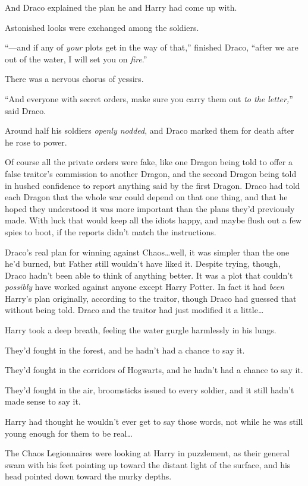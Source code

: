 And Draco explained the plan he and Harry had come up with.

Astonished looks were exchanged among the soldiers.

“—and if any of \emph{your} plots get in the way of that,” finished Draco, “after we are out of the water, I will set you on \emph{fire}.”

There was a nervous chorus of yessirs.

“And everyone with secret orders, make sure you carry them out \emph{to the letter,}” said Draco.

Around half his soldiers \emph{openly nodded}, and Draco marked them for death after he rose to power.

Of course all the private orders were fake, like one Dragon being told to offer a false traitor’s commission to another Dragon, and the second Dragon being told in hushed confidence to report anything said by the first Dragon. Draco had told each Dragon that the whole war could depend on that one thing, and that he hoped they understood it was more important than the plans they’d previously made. With luck that would keep all the idiots happy, and maybe flush out a few spies to boot, if the reports didn’t match the instructions.

Draco’s real plan for winning against Chaos…well, it was simpler than the one he’d burned, but Father still wouldn’t have liked it. Despite trying, though, Draco hadn’t been able to think of anything better. It was a plot that couldn’t \emph{possibly} have worked against anyone except Harry Potter. In fact it had \emph{been} Harry’s plan originally, according to the traitor, though Draco had guessed that without being told. Draco and the traitor had just modified it a little…

\later

Harry took a deep breath, feeling the water gurgle harmlessly in his lungs.

They’d fought in the forest, and he hadn’t had a chance to say it.

They’d fought in the corridors of Hogwarts, and he hadn’t had a chance to say it.

They’d fought in the air, broomsticks issued to every soldier, and it still hadn’t made sense to say it.

Harry had thought he wouldn’t ever get to say those words, not while he was still young enough for them to be real…

The Chaos Legionnaires were looking at Harry in puzzlement, as their general swam with his feet pointing up toward the distant light of the surface, and his head pointed down toward the murky depths.

